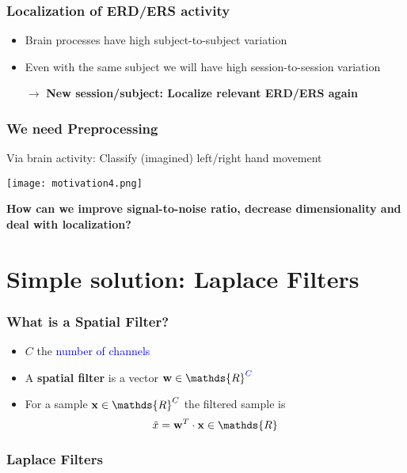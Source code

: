 \documentclass{beamer}
\begin{document}
\begin{frame}
\frametitle{Localization of ERD/ERS activity}
\centering
	\begin{itemize}
	\item Brain processes have high subject-to-subject variation
	\item Even with the same subject we will have high session-to-session variation
	\item[$\rightarrow$]{\bf New session/subject: Localize relevant ERD/ERS again}
	\end{itemize}
\end{frame}

\begin{frame}
\frametitle{We need Preprocessing}
	Via brain activity: Classify (imagined) left/right hand movement
	\begin{center}
	\texttt{[image: motivation4.png]}
	\end{center}
	{\bf How can we improve signal-to-noise ratio, decrease dimensionality and deal with localization?}
\end{frame}



\section{Simple solution: Laplace Filters}


\begin{frame}
	\frametitle{What is a Spatial Filter?}   
	\begin{itemize}
	\item $C$ the \textcolor{blue}{number of channels} \\
	\item A {\bf spatial filter} is a vector ${\bf w} \in \mathds{R}^{\textcolor{blue}{C}}$
	\item For a sample ${\bf x} \in \mathds{R}^C$ the filtered sample is
	\begin{equation}
		\tilde{x} = {\bf w}^T \cdot {\bf x} \in \mathds{R}
	\end{equation}
	\end{itemize}
\end{frame}

\begin{frame}
	\begin{center}
	\frametitle{Laplace Filters}
	\centering
	\end{center}
\end{frame}
\end{document}
